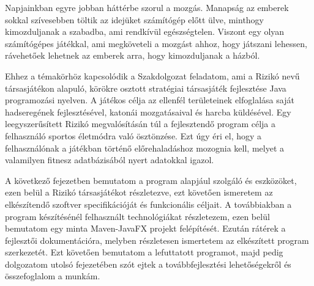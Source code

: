 Napjainkban egyre jobban háttérbe szorul a mozgás.
Manapság az emberek sokkal szívesebben töltik az idejüket számítógép előtt ülve, minthogy kimozduljanak a szabadba, ami rendkívül egészségtelen.
Viszont egy olyan számítógépes játékkal, ami megköveteli a mozgást ahhoz, hogy játszani lehessen, rávehetőek lehetnek az emberek arra, hogy kimozduljanak a házból. 

Ehhez a témakörhöz kapcsolódik a Szakdolgozat feladatom, ami a Rizikó nevű társasjátékon alapuló, körökre osztott stratégiai társasjáték fejlesztése Java programozási nyelven.
A játékos célja az ellenfél területeinek elfoglalása saját hadseregének fejlesztésével, katonái mozgatásaival és harcba küldésével.
Egy leegyszerűsített Rizikó megvalósításán túl a fejlesztendő program célja a felhasználó sportos életmódra való ösztönzése.
Ezt úgy éri el, hogy a felhasználónak a játékban történő előrehaladáshoz mozognia kell, melyet a valamilyen fitnesz adatbázisából nyert adatokkal igazol. 

A következő fejezetben bemutatom a program alapjául szolgáló és eszközöket, ezen belül a Rizikó társasjátékot részletezve, ezt követően ismeretem az elkészítendő szoftver specifikációját és funkcionális céljait.
A továbbiakban a program készítésénél felhasznált technológiákat részletezem, ezen belül bemutatom egy minta Maven-JavaFX projekt felépítését.
Ezután rátérek a fejlesztői dokumentációra, melyben részletesen ismertetem az elkészített program szerkezetét.
Ezt követően bemutatom a lefuttatott programot, majd pedig dolgozatom utolsó fejezetében szót ejtek a továbbfejlesztési lehetőségekről és összefoglalom a munkám. 
